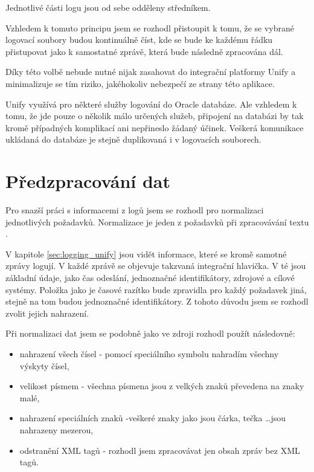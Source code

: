 \documentclass[thesis=M,czech]{FITthesis}[2012/10/20]
\begin{document}
		Jednotlivé části logu jsou od sebe odděleny středníkem.
		
		Vzhledem k tomuto principu jsem se rozhodl přistoupit k tomu, že se vybrané logovací soubory budou kontinuálně číst, kde se bude ke každému řádku přistupovat jako k samostatné zprávě, která bude následně zpracována dál.
		
		Díky této volbě nebude nutné nijak zasahovat do integrační platformy Unify a minimalizuje se tím riziko, jakéhokoliv nebezpečí ze strany této aplikace.
		
		Unify využívá pro některé služby logování do Oracle databáze. Ale vzhledem k tomu, že jde pouze o několik málo určených služeb, připojení na databázi by tak kromě případných komplikací ani nepřineslo žádaný účinek. Veškerá komunikace ukládaná do databáze je stejně duplikovaná i v logovacích souborech.
					
	\section{Předzpracování dat}
		\label{sec:preprocessing}
		
		Pro snazší práci s informacemi z logů jsem se rozhodl pro normalizaci jednotlivých požadavků. Normalizace je jeden z požadavků při zpracovávání textu \cite{txtNrmlztn}.
		
		V kapitole \ref{sec:logging_unify} jsou vidět informace, které se kromě samotné zprávy logují. V každé zprávě se objevuje takzvaná integrační hlavička. V té jsou základní údaje, jako čas odeslání, jednoznačné identifikátory, zdrojové a cílové systémy. Položka jako je časové razítko bude zpravidla pro každý požadavek jiná, stejně na tom budou jednoznačné identifikátory. Z tohoto důvodu jsem se rozhodl zvolit jejich nahrazení.
		
		Při normalizaci dat jsem se podobně jako ve zdroji \cite{Li_2013} rozhodl použít následovně:
		
		\begin{itemize} 
			\item nahrazení všech čísel - pomocí speciálního symbolu \uv{\#} nahradím všechny výskyty čísel,
			\item velikost písmem - všechna písmena jsou z velkých znaků převedena na znaky malé,
			\item nahrazení speciálních znaků -veškeré znaky jako jsou čárka, tečka \ldots jsou nahrazeny mezerou,
			\item odstranění XML tagů - rozhodl jsem zpracovávat jen obsah zpráv bez XML tagů.	
		\end{itemize}
	
\end{document}
